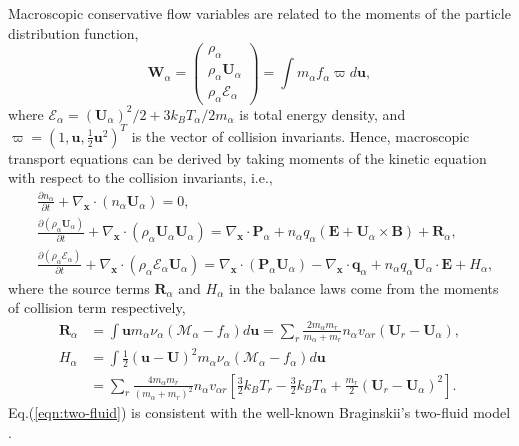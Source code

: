 \documentclass[preprint,3p,12pt,sort&compress]{elsarticle}
\begin{document}
Macroscopic conservative flow variables are related to the moments of the particle distribution function,
\begin{equation}
\mathbf{W}_\alpha =\left(
\begin{matrix}
\rho_\alpha \\
\rho_\alpha \mathbf U_\alpha \\
\rho_\alpha \mathscr E_\alpha
\end{matrix}
\right)=\int m_\alpha f_\alpha \varpi d\mathbf u,
\label{eqn:moment relation}
\end{equation}
where $\mathscr E_\alpha=(\mathbf U_\alpha)^2/2+3k_BT_\alpha/2m_\alpha$ is total energy density, and $\varpi=\left(1,\mathbf u,\frac{1}{2} \mathbf u^2 \right)^T$ is the vector of collision invariants.
Hence, macroscopic transport equations can be derived by taking moments of the kinetic equation with respect to the collision invariants, i.e.,
\begin{equation}
\begin{aligned}
&\frac{\partial n_\alpha}{\partial t}+\nabla_\mathbf x \cdot (n_\alpha \mathbf U_\alpha)=0, \\
&\frac{\partial (\rho_\alpha \mathbf U_\alpha) }{\partial t}+\nabla_\mathbf x \cdot (\rho_\alpha \mathbf U_\alpha \mathbf U_\alpha)=\nabla_\mathbf x \cdot \mathbf P_\alpha+n_\alpha q_\alpha (\mathbf E+\mathbf U_\alpha \times \mathbf B)+\mathbf R_\alpha, \\
&\frac{\partial (\rho_\alpha \mathscr E_\alpha) }{\partial t}+\nabla_\mathbf x \cdot (\rho_\alpha \mathscr E_\alpha \mathbf U_\alpha) = \nabla_\mathbf x \cdot (\mathbf P_\alpha\mathbf U_\alpha ) - \nabla_\mathbf x \cdot \mathbf q_\alpha + n_\alpha q_\alpha \mathbf U_\alpha \cdot \mathbf E + H_\alpha,
\end{aligned}
\label{eqn:two-fluid}
\end{equation}
where the source terms $\mathbf R_\alpha$ and $H_\alpha$ in the balance laws come from the moments of collision term respectively,
\begin{equation}
\begin{aligned} 
\mathbf R _ { \alpha } & = \int \mathbf { u } m_\alpha { \nu _ { \alpha } } ( \mathcal M _ { \alpha } - f _ { \alpha } ) d \mathbf { u } = \sum _ { r } \frac { 2 m _ { \alpha } m _ { r } } { m _ { \alpha } + m _ { r } } n _ { \alpha } v _ { \alpha r } \left( \mathbf { U } _ { r } - \mathbf { U } _ { \alpha } \right), \\ 
H _ { \alpha } & = \int \frac { 1 } { 2 } ( \mathbf { u } - \mathbf { U } ) ^ { 2 } m_\alpha { \nu _ { \alpha } } ( \mathcal M _ { \alpha } - f _ { \alpha } ) d \mathbf { u } \\ & = \sum _ { r } \frac { 4 m _ { \alpha } m _ { r } } { \left( m _ { \alpha } + m _ { r } \right) ^ { 2 } } n _ { \alpha } v _ { \alpha r } \left[ \frac { 3 } { 2 } k _ { B } T _ { r } - \frac { 3 } { 2 } k _ { B } T _ { \alpha } + \frac { m _ { r } } { 2 } \left( \mathbf { U } _ { r } - \mathbf { U } _ { \alpha } \right) ^ { 2 } \right].
\end{aligned}
\end{equation}
Eq.(\ref{eqn:two-fluid}) is consistent with the well-known Braginskii's two-fluid model \cite{braginskii1965transport}.
\end{document}

